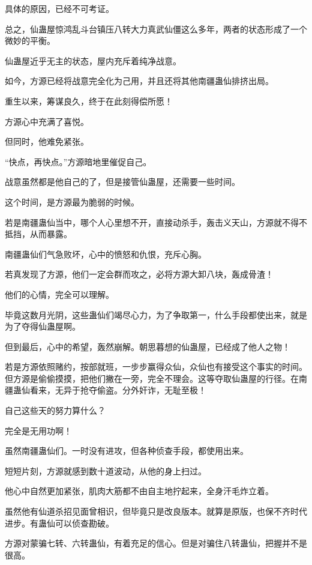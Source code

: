 
\begin{this_body}

具体的原因，已经不可考证。

总之，仙蛊屋惊鸿乱斗台镇压八转大力真武仙僵这么多年，两者的状态形成了一个微妙的平衡。

仙蛊屋近乎无主的状态，屋内充斥着纯净战意。

如今，方源已经将战意完全化为己用，并且还将其他南疆蛊仙排挤出局。

重生以来，筹谋良久，终于在此刻得偿所愿！

方源心中充满了喜悦。

但同时，他难免紧张。

“快点，再快点。”方源暗地里催促自己。

战意虽然都是他自己的了，但是接管仙蛊屋，还需要一些时间。

这个时间，是方源最为脆弱的时候。

若是南疆蛊仙当中，哪个人心里想不开，直接动杀手，轰击义天山，方源就不得不抵挡，从而暴露。

南疆蛊仙们气急败坏，心中的愤怒和仇恨，充斥心胸。

若真发现了方源，他们一定会群而攻之，必将方源大卸八块，轰成骨渣！

他们的心情，完全可以理解。

毕竟这数月光阴，这些蛊仙们竭尽心力，为了争取第一，什么手段都使出来，就是为了夺得仙蛊屋啊。

但到最后，心中的希望，轰然崩解。朝思暮想的仙蛊屋，已经成了他人之物！

若是方源依照赌约，按部就班，一步步赢得众仙，众仙也有接受这个事实的时间。但方源是偷偷摸摸，把他们撇在一旁，完全不理会。这等夺取仙蛊屋的行径。在南疆蛊仙看来，无异于抢夺偷盗。分外奸诈，无耻至极！

自己这些天的努力算什么？

完全是无用功啊！

虽然南疆蛊仙们。一时没有进攻，但各种侦查手段，都使用出来。

短短片刻，方源就感到数十道波动，从他的身上扫过。

他心中自然更加紧张，肌肉大筋都不由自主地拧起来，全身汗毛炸立着。

虽然他有仙道杀招见面曾相识，但毕竟只是改良版本。就算是原版，也保不齐时代进步。有蛊仙可以侦查勘破。

方源对蒙骗七转、六转蛊仙，有着充足的信心。但是对骗住八转蛊仙，把握并不是很高。


\end{this_body}
